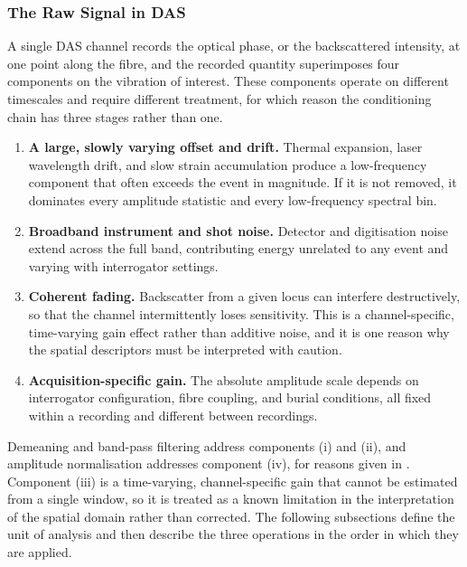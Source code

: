 \subsubsection{The Raw Signal in DAS}
\label{sec:chap3RawSignal}
A single DAS channel records the optical phase, or the backscattered intensity, at one point along the fibre, and the recorded quantity superimposes four components on the vibration of interest. These components operate on different timescales and require different treatment, for which reason the conditioning chain has three stages rather than one.

\begin{enumerate}[label=(\roman*), leftmargin=*, itemsep=3pt]
	\item \textbf{A large, slowly varying offset and drift.} Thermal expansion, laser wavelength drift, and slow strain accumulation produce a low-frequency component that often exceeds the event in magnitude. If it is not removed, it dominates every amplitude statistic and every low-frequency spectral bin.
	\item \textbf{Broadband instrument and shot noise.} Detector and digitisation noise extend across the full band, contributing energy unrelated to any event and varying with interrogator settings.
	\item \textbf{Coherent fading.} Backscatter from a given locus can interfere destructively, so that the channel intermittently loses sensitivity. This is a channel-specific, time-varying gain effect rather than additive noise, and it is one reason why the spatial descriptors must be interpreted with caution.
	\item \textbf{Acquisition-specific gain.} The absolute amplitude scale depends on interrogator configuration, fibre coupling, and burial conditions, all fixed within a recording and different between recordings.
\end{enumerate}

Demeaning and band-pass filtering address components (i) and (ii), and amplitude normalisation addresses component (iv), for reasons given in . Component (iii) is a time-varying, channel-specific gain that cannot be estimated from a single window, so it is treated as a known limitation in the interpretation of the spatial domain rather than corrected. The following subsections define the unit of analysis and then describe the three operations in the order in which they are applied.

